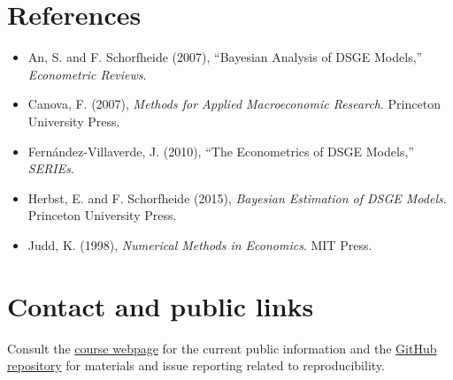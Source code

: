 \documentclass[11pt,a4paper]{article}
\begin{document}
\section*{References}
\begin{itemize}
\item An, S. and F. Schorfheide (2007), ``Bayesian Analysis of DSGE Models,'' \emph{Econometric Reviews}.
\item Canova, F. (2007), \emph{Methods for Applied Macroeconomic Research}. Princeton University Press.
\item Fernández-Villaverde, J. (2010), ``The Econometrics of DSGE Models,'' \emph{SERIEs}.
\item Herbst, E. and F. Schorfheide (2015), \emph{Bayesian Estimation of DSGE Models}. Princeton University Press.
\item Judd, K. (1998), \emph{Numerical Methods in Economics}. MIT Press.
\end{itemize}

\section*{Contact and public links}
Consult the \href{https://vermandel.org/btm/}{course webpage} for the current public information and the \href{https://github.com/Vermandel/bayesian-techniques-macroeconomics}{GitHub repository} for materials and issue reporting related to reproducibility.
\end{document}
